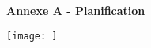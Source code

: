 \begin{center}
{\Large \textbf{Annexe A - Planification}} \newline
\end{center}
\thispagestyle{plain}
\label{AppendixA} %
\texttt{[image: ]}